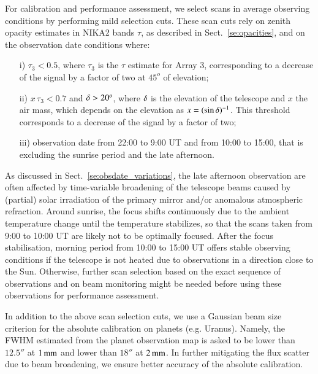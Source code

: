 For calibration and performance assessment, we select scans in average
observing conditions by performing mild selection cuts. These scan
cuts rely on zenith opacity estimates in NIKA2 bands $\tau$, as
described in Sect.~\ref{se:opacities}, and on the observation date
conditions where:
%
\begin{itemize}
\item[i)] $\tau_{3} < 0.5$, where $\tau_{3}$ is the $\tau$ estimate for
  Array 3, corresponding to a decrease of the signal by a factor of
  two at $45^{o}$ of elevation;
\item[ii)] $x\, \tau_{3} < 0.7$ and $\delta > 20^{o}$, where $\delta$ is the
  elevation of the telescope and $x$ the
  air mass, which depends on the elevation as $x=(\sin{\delta})^{-1}$. This
  threshold corresponds to a decrease of the signal by a factor of two;
\item[iii)] observation date from 22:00 to 9:00 UT and from 10:00 to
  15:00, that is excluding the sunrise period and the late afternoon.
\end{itemize}
%
As discussed in Sect.~\ref{se:obsdate_variations}, the late afternoon
observation are often affected by time-variable broadening of the
telescope beams caused by (partial) solar irradiation of the primary
mirror and/or anomalous atmospheric refraction.
Around sunrise, the focus shifts continuously due to the ambient temperature
change until the temperature stabilizes, so that the scans taken from
9:00 to 10:00 UT are likely not to be optimally focused.
After the focus stabilisation, morning period 
from 10:00 to 15:00 UT offers stable observing conditions
if the telescope is not heated due to observations in a
direction close to the Sun. Otherwise, further scan selection based on
the exact sequence of observations and on beam monitoring might be needed before using these
observations for performance assessment.

   
In addition to the above scan selection cuts, we use a Gaussian beam
size criterion for the absolute calibration on planets
(e.g. Uranus). Namely, the FWHM estimated from the planet observation
map is asked to be lower than $12.5''$ at $1\,\rm{mm}$ and lower than $18''$ at
$2\,\rm{mm}$. In further mitigating the flux scatter due to beam broadening, we
ensure better accuracy of the absolute calibration.  

